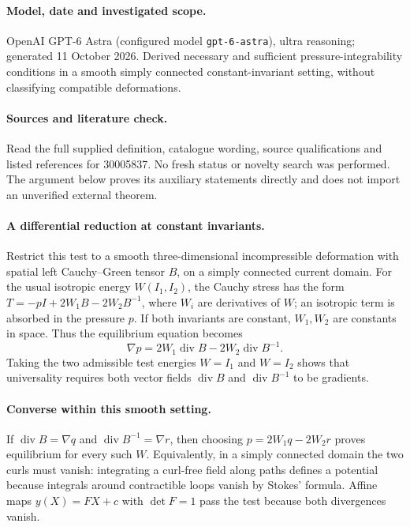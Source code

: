 \documentclass[11pt]{article}
\begin{document}
\paragraph{Model, date and investigated scope.}
OpenAI GPT-6 Astra (configured model \texttt{gpt-6-astra}), ultra reasoning; generated 11 October 2026. Derived necessary and sufficient pressure-integrability conditions in a smooth simply connected constant-invariant setting, without classifying compatible deformations.

\paragraph{Sources and literature check.}
Read the full supplied definition, catalogue wording, source qualifications and listed references for 30005837. No fresh status or novelty search was performed. The argument below proves its auxiliary statements directly and does not import an unverified external theorem.

\paragraph{A differential reduction at constant invariants.} Restrict this test to a smooth three-dimensional incompressible deformation with spatial left Cauchy--Green tensor \(B\), on a simply connected current domain. For the usual isotropic energy \(W(I_1,I_2)\), the Cauchy stress has the form \(T=-pI+2W_1B-2W_2B^{-1}\), where \(W_i\) are derivatives of \(W\); an isotropic term is absorbed in the pressure \(p\). If both invariants are constant, \(W_1,W_2\) are constants in space. Thus the equilibrium equation becomes
\[
 \nabla p=2W_1\operatorname{div}B-2W_2\operatorname{div}B^{-1}.
\]
Taking the two admissible test energies \(W=I_1\) and \(W=I_2\) shows that universality requires both vector fields \(\operatorname{div}B\) and \(\operatorname{div}B^{-1}\) to be gradients.
\paragraph{Converse within this smooth setting.} If \(\operatorname{div}B=\nabla q\) and \(\operatorname{div}B^{-1}=\nabla r\), then choosing \(p=2W_1q-2W_2r\) proves equilibrium for every such \(W\). Equivalently, in a simply connected domain the two curls must vanish: integrating a curl-free field along paths defines a potential because integrals around contractible loops vanish by Stokes' formula. Affine maps \(y(X)=FX+c\) with \(\det F=1\) pass the test because both divergences vanish.
\end{document}
